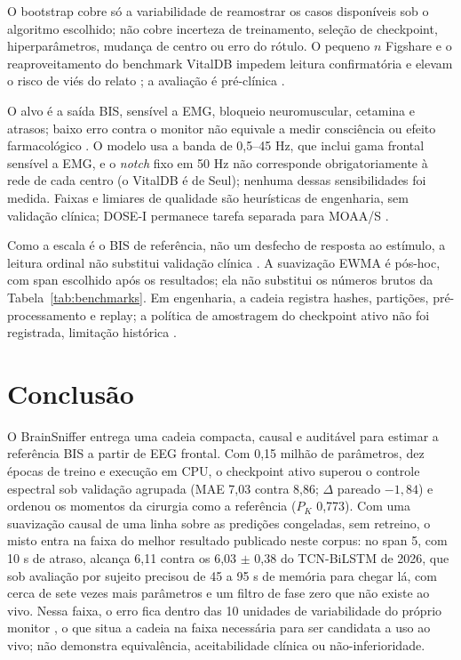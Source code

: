 \documentclass[12pt]{article}
\begin{document}
O bootstrap cobre só a variabilidade de reamostrar os casos disponíveis sob o algoritmo escolhido; não cobre incerteza de treinamento, seleção de checkpoint, hiperparâmetros, mudança de centro ou erro do rótulo. O pequeno $n$ Figshare e o reaproveitamento do benchmark VitalDB impedem leitura confirmatória e elevam o risco de viés do relato \cite{field2007,archer2021,probastai}; a avaliação é pré-clínica \cite{decideai}.

O alvo é a saída BIS, sensível a EMG, bloqueio neuromuscular, cetamina e atrasos; baixo erro contra o monitor não equivale a medir consciência ou efeito farmacológico \cite{schuller2015,hans2005,pilge2006}. O modelo usa a banda de 0,5--45 Hz, que inclui gama frontal sensível a EMG, e o \textit{notch} fixo em 50 Hz não corresponde obrigatoriamente à rede de cada centro (o VitalDB é de Seul); nenhuma dessas sensibilidades foi medida. Faixas e limiares de qualidade são heurísticas de engenharia, sem validação clínica; DOSE-I permanece tarefa separada para MOAA/S \cite{dosei}.

Como a escala é o BIS de referência, não um desfecho de resposta ao estímulo, a leitura ordinal não substitui validação clínica \cite{smith1996}. A suavização EWMA é pós-hoc, com span escolhido após os resultados; ela não substitui os números brutos da Tabela~\ref{tab:benchmarks}. Em engenharia, a cadeia registra hashes, partições, pré-processamento e replay; a política de amostragem do checkpoint ativo não foi registrada, limitação histórica \cite{tripodai}.

\section{Conclusão}

O BrainSniffer entrega uma cadeia compacta, causal e auditável para estimar a referência BIS a partir de EEG frontal. Com 0,15 milhão de parâmetros, dez épocas de treino e execução em CPU, o checkpoint ativo superou o controle espectral sob validação agrupada (MAE 7,03 contra 8,86; $\Delta$ pareado $-1{,}84$) e ordenou os momentos da cirurgia como a referência ($P_K$ 0,773). Com uma suavização causal de uma linha sobre as predições congeladas, sem retreino, o misto entra na faixa do melhor resultado publicado neste corpus: no span 5, com 10 s de atraso, alcança 6,11 contra os 6,03 $\pm$ 0,38 do TCN-BiLSTM de 2026, que sob avaliação por sujeito precisou de 45 a 95 s de memória para chegar lá, com cerca de sete vezes mais parâmetros e um filtro de fase zero que não existe ao vivo. Nessa faixa, o erro fica dentro das 10 unidades de variabilidade do próprio monitor \cite{harada2021}, o que situa a cadeia na faixa necessária para ser candidata a uso ao vivo; não demonstra equivalência, aceitabilidade clínica ou não-inferioridade.
\end{document}
